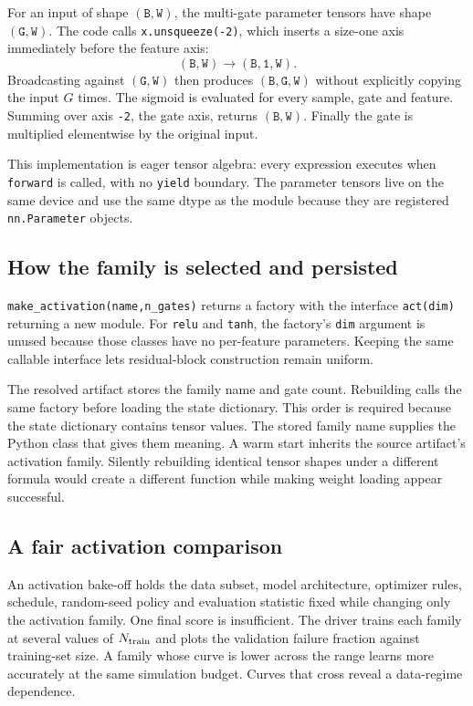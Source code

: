 \documentclass[10pt,aps,prd,twocolumn,nofootinbib]{revtex4-2}
\newcommand{\code}[1]{\texttt{#1}}
\newcommand{\shape}[1]{\ensuremath{\mathtt{#1}}}
\begin{document}
For an input of shape \shape{(B,W)}, the multi-gate parameter tensors have
shape \shape{(G,W)}.  The code calls \code{x.unsqueeze(-2)}, which inserts a
size-one axis immediately before the feature axis:
\begin{equation*}
  \shape{(B,W)}\longrightarrow\shape{(B,1,W)}.
\end{equation*}
Broadcasting against \shape{(G,W)} then produces
\shape{(B,G,W)} without explicitly copying the input \(G\) times.  The
sigmoid is evaluated for every sample, gate and feature.  Summing over axis
\code{-2}, the gate axis, returns \shape{(B,W)}.  Finally the gate is
multiplied elementwise by the original input.

This implementation is eager tensor algebra: every expression executes when
\code{forward} is called, with no \code{yield} boundary.  The parameter tensors live on the same device and use the same
dtype as the module because they are registered \code{nn.Parameter} objects.

\subsection{How the family is selected and persisted}

\code{make\_activation(name,n\_gates)} returns a factory with the interface
\code{act(dim)} returning a new module.  For \code{relu} and \code{tanh}, the
factory's \code{dim} argument is unused because those classes have no
per-feature parameters.  Keeping the same callable interface lets
residual-block construction remain uniform.

The resolved artifact stores the family name and gate count.  Rebuilding
calls the same factory before loading the state dictionary.  This order is
required because the state dictionary contains tensor values.  The stored
family name supplies the Python class that gives them meaning.  A warm start inherits the source
artifact's activation family.  Silently rebuilding identical tensor shapes
under a different formula would create a different function while making
weight loading appear successful.

\subsection{A fair activation comparison}

An activation bake-off holds the data subset, model architecture, optimizer
rules, schedule, random-seed policy and evaluation statistic fixed while
changing only the activation family.  One final score is insufficient.  The
driver trains each family at several values of \(N_{\rm train}\) and plots
the validation failure fraction against training-set size.  A family whose
curve is lower across the range learns more accurately at the same simulation
budget.  Curves that cross reveal a data-regime dependence.
\end{document}
